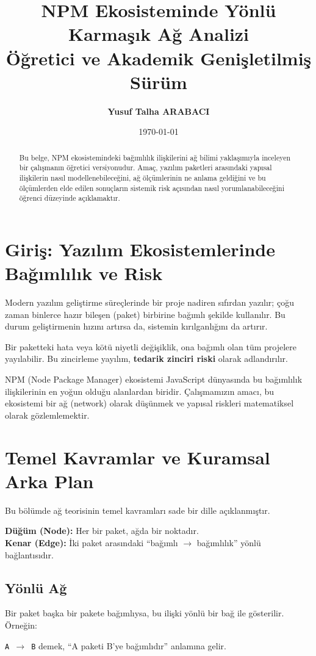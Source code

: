 \documentclass[11pt,a4paper]{article}
\title{NPM Ekosisteminde Yönlü Karmaşık Ağ Analizi \\
\large Öğretici ve Akademik Genişletilmiş Sürüm}
\author{\textbf{Yusuf Talha ARABACI}}
\date{\today}
\begin{document}
\maketitle

\begin{abstract}
Bu belge, NPM ekosistemindeki bağımlılık ilişkilerini ağ bilimi yaklaşımıyla inceleyen bir çalışmanın öğretici versiyonudur. Amaç, yazılım paketleri arasındaki yapısal ilişkilerin nasıl modellenebileceğini, ağ ölçümlerinin ne anlama geldiğini ve bu ölçümlerden elde edilen sonuçların sistemik risk açısından nasıl yorumlanabileceğini öğrenci düzeyinde açıklamaktır. 
\end{abstract}

\clearpage

\section{Giriş: Yazılım Ekosistemlerinde Bağımlılık ve Risk}
Modern yazılım geliştirme süreçlerinde bir proje nadiren sıfırdan yazılır; çoğu zaman binlerce hazır bileşen (paket) birbirine bağımlı şekilde kullanılır. Bu durum geliştirmenin hızını artırsa da, sistemin kırılganlığını da artırır.

\begin{tipbox}
Bir paketteki hata veya kötü niyetli değişiklik, ona bağımlı olan tüm projelere yayılabilir. Bu zincirleme yayılım, \textbf{tedarik zinciri riski} olarak adlandırılır.
\end{tipbox}

NPM (Node Package Manager) ekosistemi JavaScript dünyasında bu bağımlılık ilişkilerinin en yoğun olduğu alanlardan biridir. Çalışmamızın amacı, bu ekosistemi bir ağ (network) olarak düşünmek ve yapısal riskleri matematiksel olarak gözlemlemektir.

\section{Temel Kavramlar ve Kuramsal Arka Plan}
Bu bölümde ağ teorisinin temel kavramları sade bir dille açıklanmıştır.

\begin{gloss}
\textbf{Düğüm (Node):} Her bir paket, ağda bir noktadır. \\
\textbf{Kenar (Edge):} İki paket arasındaki “bağımlı $\to$ bağımlılık” yönlü bağlantısıdır.
\end{gloss}

\subsection{Yönlü Ağ}
Bir paket başka bir pakete bağımlıysa, bu ilişki yönlü bir bağ ile gösterilir. Örneğin:
\begin{center}
\texttt{A $\to$ B} demek, “A paketi B’ye bağımlıdır” anlamına gelir.
\end{center}
\end{document}
